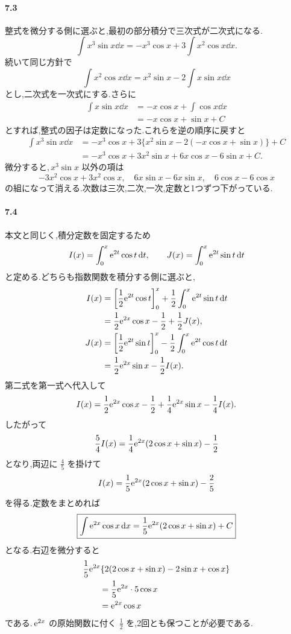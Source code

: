 \paragraph{7.3}
整式を微分する側に選ぶと,最初の部分積分で三次式が二次式になる.
\[
 \int x^3\sin x\dd x
 =-x^3\cos x+3\int x^2\cos x\dd x.
\]
続いて同じ方針で
\[
 \int x^2\cos x\dd x
 =x^2\sin x-2\int x\sin x\dd x
\]
とし,二次式を一次式にする.さらに
\[
\begin{aligned}
 \int x\sin x\dd x
 &=-x\cos x+\int\cos x\dd x\\
 &=-x\cos x+\sin x+C
\end{aligned}
\]
とすれば,整式の因子は定数になった.これらを逆の順序に戻すと
\[
\begin{aligned}
 \int x^3\sin x\dd x
 &=-x^3\cos x
   +3\{x^2\sin x-2(-x\cos x+\sin x)\}+C\\
 &=-x^3\cos x+3x^2\sin x+6x\cos x-6\sin x+C.
\end{aligned}
\]
微分すると,\,$x^3\sin x$ 以外の項は
\[
 -3x^2\cos x+3x^2\cos x,
 \quad 6x\sin x-6x\sin x,
 \quad 6\cos x-6\cos x
\]
の組になって消える.次数は三次,二次,一次,定数と1つずつ下がっている.

\paragraph{7.4}
本文と同じく,積分定数を固定するため
\[
 I(x)=\int_0^x\mathrm{e}^{2t}\cos t\,\mathrm{d} t,
 \qquad
 J(x)=\int_0^x\mathrm{e}^{2t}\sin t\,\mathrm{d} t
\]
と定める.どちらも指数関数を積分する側に選ぶと,
\[
\begin{aligned}
 I(x)
 &=\left[\frac12\mathrm{e}^{2t}\cos t\right]_0^x
   +\frac12\int_0^x\mathrm{e}^{2t}\sin t\,\mathrm{d} t\\
 &=\frac12\mathrm{e}^{2x}\cos x-\frac12+\frac12J(x),\\
 J(x)
 &=\left[\frac12\mathrm{e}^{2t}\sin t\right]_0^x
   -\frac12\int_0^x\mathrm{e}^{2t}\cos t\,\mathrm{d} t\\
 &=\frac12\mathrm{e}^{2x}\sin x-\frac12I(x).
\end{aligned}
\]
第二式を第一式へ代入して
\[
 I(x)=\frac12\mathrm{e}^{2x}\cos x-\frac12
       +\frac14\mathrm{e}^{2x}\sin x-\frac14I(x).
\]
したがって
\[
 \frac54I(x)=\frac14\mathrm{e}^{2x}(2\cos x+\sin x)-\frac12
\]
となり,両辺に $\frac45$ を掛けて
\[
 I(x)=\frac15\mathrm{e}^{2x}(2\cos x+\sin x)-\frac25
\]
を得る.定数をまとめれば
\[
 \boxed{\int\mathrm{e}^{2x}\cos x\,\mathrm{d} x
 =\frac15\mathrm{e}^{2x}(2\cos x+\sin x)+C}
\]
となる.右辺を微分すると
\[
\begin{aligned}
 &\frac15\mathrm{e}^{2x}
 \{2(2\cos x+\sin x)-2\sin x+\cos x\}\\
 &\qquad=\frac15\mathrm{e}^{2x}\cdot5\cos x\\
 &\qquad=\mathrm{e}^{2x}\cos x
\end{aligned}
\]
である.\,$\mathrm{e}^{2x}$ の原始関数に付く $\frac12$ を,2回とも保つことが必要である.

